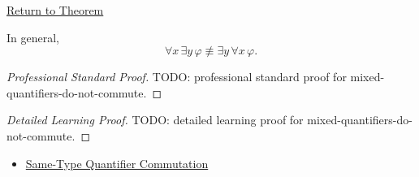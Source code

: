 \newpage
{}
\label{prf:mixed-quantifiers-do-not-commute}

\begin{remark*}[Return]
\hyperref[thm:mixed-quantifiers-do-not-commute]{Return to Theorem}
\end{remark*}

\begin{theorem*}
In general,
\[
\forall x\,\exists y\,\varphi
\not\equiv
\exists y\,\forall x\,\varphi.
\]
\end{theorem*}

\begin{proof}[Professional Standard Proof]
\LRAProofBodyStart
TODO: professional standard proof for mixed-quantifiers-do-not-commute.
\end{proof}

\begin{proof}[Detailed Learning Proof]
\LRAProofBodyStart
TODO: detailed learning proof for mixed-quantifiers-do-not-commute.
\end{proof}

\begin{remark*}
\end{remark*}

\begin{dependencies}
\begin{itemize}
  \item \hyperref[thm:qcomm]{Same-Type Quantifier Commutation}
\end{itemize}
\end{dependencies}

\clearpage
